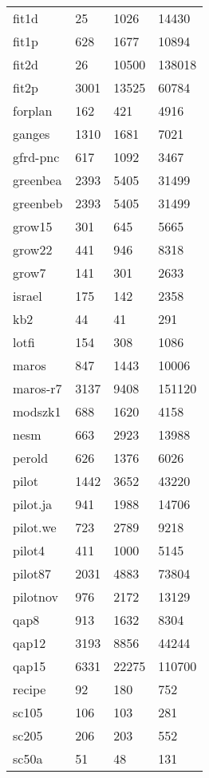 \begin{tabular}{llll}
fit1d    & 25    & 1026  & 14430    \\
fit1p    & 628   & 1677  & 10894    \\
fit2d    & 26    & 10500 & 138018   \\
fit2p    & 3001  & 13525 & 60784    \\
forplan  & 162   & 421   & 4916     \\
ganges   & 1310  & 1681  & 7021     \\
gfrd-pnc & 617   & 1092  & 3467     \\
greenbea & 2393  & 5405  & 31499    \\
greenbeb & 2393  & 5405  & 31499    \\
grow15   & 301   & 645   & 5665     \\
grow22   & 441   & 946   & 8318     \\
grow7    & 141   & 301   & 2633     \\
israel   & 175   & 142   & 2358     \\
kb2      & 44    & 41    & 291      \\
lotfi    & 154   & 308   & 1086     \\
maros    & 847   & 1443  & 10006    \\
maros-r7 & 3137  & 9408  & 151120   \\
modszk1  & 688   & 1620  & 4158     \\
nesm     & 663   & 2923  & 13988    \\
perold   & 626   & 1376  & 6026     \\
pilot    & 1442  & 3652  & 43220    \\
pilot.ja & 941   & 1988  & 14706    \\
pilot.we & 723   & 2789  & 9218     \\
pilot4   & 411   & 1000  & 5145     \\
pilot87  & 2031  & 4883  & 73804    \\
pilotnov & 976   & 2172  & 13129    \\
qap8     & 913   & 1632  & 8304     \\
qap12    & 3193  & 8856  & 44244    \\
qap15    & 6331  & 22275 & 110700   \\
recipe   & 92    & 180   & 752      \\
sc105    & 106   & 103   & 281      \\
sc205    & 206   & 203   & 552      \\
sc50a    & 51    & 48    & 131      \\

\end{tabular}
